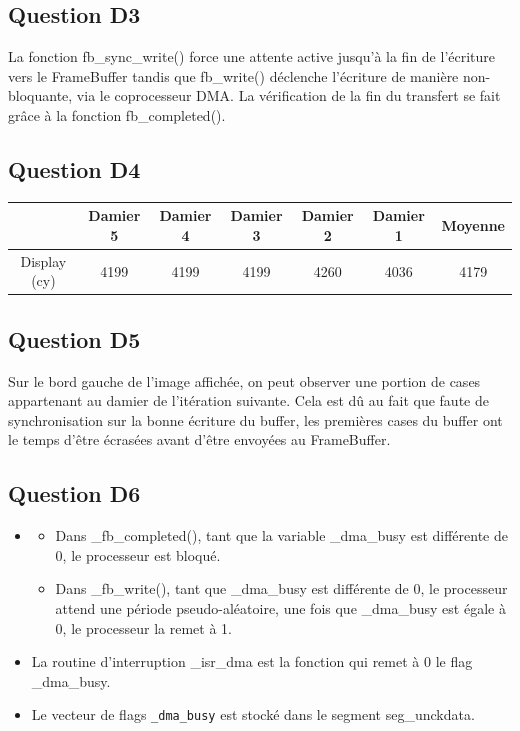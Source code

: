 \documentclass[10pt]{article}
\begin{document}
\subsection{Question D3}

La fonction fb\_sync\_write() force une attente active jusqu'à la fin de
l'écriture vers le FrameBuffer tandis que fb\_write() déclenche l'écriture de
manière non-bloquante, via le coprocesseur DMA. La vérification de la fin du
transfert se fait grâce à la fonction fb\_completed().

\subsection{Question D4}
\begin{center}
  \begin{tabular}{|c|c|c|c|c|c|c|}
    \hline
     & Damier 5 & Damier 4 & Damier 3 & Damier 2 & Damier 1 & Moyenne \\ \hline
     Display (cy) & 4199 & 4199 & 4199 & 4260 & 4036 & 4179 \\ \hline
  \end{tabular}
\end{center}

\subsection{Question D5}
Sur le bord gauche de l'image affichée, on peut observer une portion de cases
appartenant au damier de l'itération suivante. Cela est dû au fait que faute
de synchronisation sur la bonne écriture du buffer, les premières cases du
buffer ont le temps d'être écrasées avant d'être envoyées au FrameBuffer.

\subsection{Question D6}
\begin{itemize}
  \item
  \begin{itemize}
    \item Dans \_fb\_completed(), tant que la variable \_dma\_busy est
    différente de 0, le processeur est bloqué.
    \item Dans \_fb\_write(), tant que \_dma\_busy est différente de 0, le
    processeur attend une période pseudo-aléatoire, une fois que \_dma\_busy est
    égale à 0, le processeur la remet à 1.
  \end{itemize}
  \item La routine d'interruption \_isr\_dma est la fonction qui remet à 0 le
  flag \_dma\_busy.
  \item Le vecteur de flags \texttt{\_dma\_busy} est stocké dans le segment
  seg\_unckdata.
\end{itemize}
\end{document}
